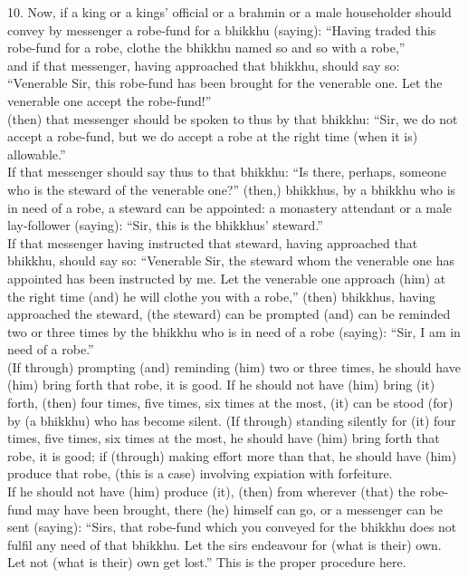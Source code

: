 \documentclass[12pt]{article}
\begin{document}
\begin{paracol}{2}
\begin{column}
{\begin{doublespace}
10. Now, if a king or a kings’ official or a brahmin or a male householder should convey by messenger a robe-fund for a bhikkhu (saying): “Having traded this robe-fund for a robe, clothe the bhikkhu named so and so with a robe,” \\
and if that messenger, having approached that bhikkhu, should say so: “Venerable Sir, this robe-fund has been brought for the venerable one. Let the venerable one accept the robe-fund!”\\
(then) that messenger should be spoken to thus by that bhikkhu: “Sir, we do not accept a robe-fund, but we do accept a robe at the right time (when it is) allowable.”\\
If that messenger should say thus to that bhikkhu: “Is there, perhaps, someone who is the steward of the venerable one?” (then,) bhikkhus, by a bhikkhu who is in need of a robe, a steward can be appointed: a monastery attendant or a male lay-follower (saying): “Sir, this is the bhikkhus' steward.”\\
If that messenger having instructed that steward, having approached that bhikkhu, should say so: “Venerable Sir, the steward whom the venerable one has appointed has been instructed by me. Let the venerable one approach (him) at the right time (and) he will clothe you with a robe,” (then) bhikkhus, having approached the steward, (the steward) can be prompted (and) can be reminded two or three times by the bhikkhu who is in need of a robe (saying): “Sir, I am in need of a robe.”\\
(If through) prompting (and) reminding (him) two or three times, he should have (him) bring forth that robe, it is good. If he should not have (him) bring (it) forth, (then) four times, five times, six times at the most, (it) can be stood (for) by (a bhikkhu) who has become silent. (If through) standing silently for (it) four times, five times, six times at the most, he should have (him) bring forth that robe, it is good; if (through) making effort more than that, he should have (him) produce that robe, (this is a case) involving expiation with forfeiture.\\
If he should not have (him) produce (it), (then) from wherever (that) the robe-fund may have been brought, there (he) himself can go, or a messenger can be sent (saying): “Sirs, that robe-fund which you conveyed for the bhikkhu does not fulfil any need of that bhikkhu. Let the sirs endeavour for (what is their) own. Let not (what is their) own get lost.” This is the proper procedure here.
\end{doublespace}}


\end{column}
\end{paracol}
\end{document}
